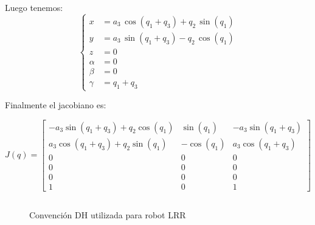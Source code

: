 \documentclass[a4paper,12pt]{article}
\begin{document}
Luego tenemos:
\begin{equation*}
    \left\{
    \begin{aligned}
    x &= a_{3}\,\cos\left(q_{1}+q_{3}\right)+q_{2}\,\sin\left(q_{1}\right)\\
    y &= a_{3}\,\sin\left(q_{1}+q_{3}\right)-q_{2}\,\cos\left(q_{1}\right)\\
    z &= 0 \\
    \alpha &= 0 \\
    \beta &= 0 \\
    \gamma &= q_1 + q_3
    \end{aligned}
    \right.
\end{equation*}

Finalmente el jacobiano es:

\begin{equation}
    J(q) = 
    \begin{bmatrix}
        -a_3\sin(q_1 + q_3) + q_2\cos(q_1) & \sin(q_1)  & -a_3\sin(q_1 + q_3)\\
        a_3\cos(q_1 + q_3)  + q_2\sin(q_1) & -\cos(q_1) & a_3\cos(q_1 + q_3)\\
        0 & 0 & 0\\
        0 & 0 & 0\\
        0 & 0 & 0\\
        1 & 0 & 1
    \end{bmatrix}
\end{equation}

\subsection{}

\begin{figure}[H]
    \centering
    \begin{adjustbox}{scale = 0.55, max width=\columnwidth}
    \end{adjustbox}
    \caption{Convención DH utilizada para robot LRR}
\end{figure}
\end{document}
